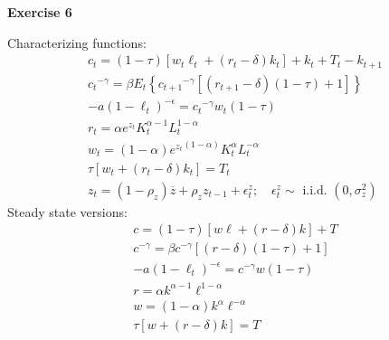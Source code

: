\documentclass[12pt]{article}
\begin{document}
\textbf{Exercise 6} \par
    Characterizing functions:
    \begin{gather}
        c_{t}=(1-\tau)\left[w_{t} \ell_{t}+\left(r_{t}-\delta\right) k_{t}\right]+k_{t}+T_{t}-k_{t+1} \\
        {c_{t}}^{-\gamma}=\beta E_{t}\left\{{c_{t+1}}^{-\gamma}\left[\left(r_{t+1}-\delta\right)(1-\tau)+1\right]\right\} \\
        -a (1-\ell_t)^{-\epsilon}={c_{t}}^{-\gamma} w_{t}(1-\tau) \\
        r_{t}=\alpha e^{z_{t}} K_{t}^{\alpha - 1} L_{t}^{1-\alpha} \\
        w_{t}=(1-\alpha) {e^{z_{t}}}^{(1-\alpha)} K_{t}^{\alpha} L_{t}^{-\alpha} \\
        \tau\left[w_{t}+\left(r_{t}-\delta\right) k_{t}\right]=T_{t} \\
        z_{t}=\left(1-\rho_{z}\right) \overline{z}+\rho_{z} z_{t-1}+\epsilon_{t}^{z} ; \quad \epsilon_{t}^{z} \sim \text { i.i.d. }\left(0, \sigma_{z}^{2}\right)
    \end{gather}
    Steady state versions:
    \begin{gather}
        c=(1-\tau)\left[w \ell+\left(r-\delta\right) k\right]+T \\
        {c}^{-\gamma}=\beta {c}^{-\gamma}\left[\left(r-\delta\right)(1-\tau)+1\right] \\
        -a (1-\ell_t)^{-\epsilon} = {c}^{-\gamma} w(1-\tau) \\
        r=\alpha k^{\alpha - 1} \ell^{1-\alpha}\\
        w=(1-\alpha) k^{\alpha} \ell^{-\alpha}\\
        \tau\left[w+\left(r-\delta\right) k\right]=T
    \end{gather}
 
 
\end{document}
